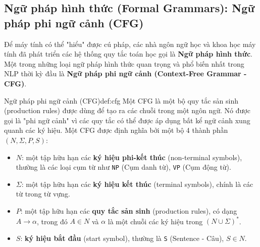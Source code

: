 \subsection{Ngữ pháp hình thức (Formal Grammars): Ngữ pháp phi ngữ cảnh (CFG)}
\label{ssec:cfg}

Để máy tính có thể "hiểu" được cú pháp, các nhà ngôn ngữ học và khoa học máy tính đã phát triển các hệ thống quy tắc toán học gọi là \textbf{Ngữ pháp hình thức}. Một trong những loại ngữ pháp hình thức quan trọng và phổ biến nhất trong NLP thời kỳ đầu là \textbf{Ngữ pháp phi ngữ cảnh (Context-Free Grammar - CFG)}.

\begin{definition}{Ngữ pháp phi ngữ cảnh (CFG)}{def:cfg}
    Một CFG là một bộ quy tắc sản sinh (production rules) được dùng để tạo ra các chuỗi trong một ngôn ngữ. Nó được gọi là "phi ngữ cảnh" vì các quy tắc có thể được áp dụng bất kể ngữ cảnh xung quanh các ký hiệu. Một CFG được định nghĩa bởi một bộ 4 thành phần $(N, \Sigma, P, S)$:
    \begin{itemize}
        \item $N$: một tập hữu hạn các \textbf{ký hiệu phi-kết thúc} (non-terminal symbols), thường là các loại cụm từ như \texttt{NP} (Cụm danh từ), \texttt{VP} (Cụm động từ).
        \item $\Sigma$: một tập hữu hạn các \textbf{ký hiệu kết thúc} (terminal symbols), chính là các từ trong từ vựng.
        \item $P$: một tập hữu hạn các \textbf{quy tắc sản sinh} (production rules), có dạng $A \rightarrow \alpha$, trong đó $A \in N$ và $\alpha$ là một chuỗi các ký hiệu trong $(N \cup \Sigma)^*$.
        \item $S$: \textbf{ký hiệu bắt đầu} (start symbol), thường là \texttt{S} (Sentence - Câu), $S \in N$.
    \end{itemize}
\end{definition}


